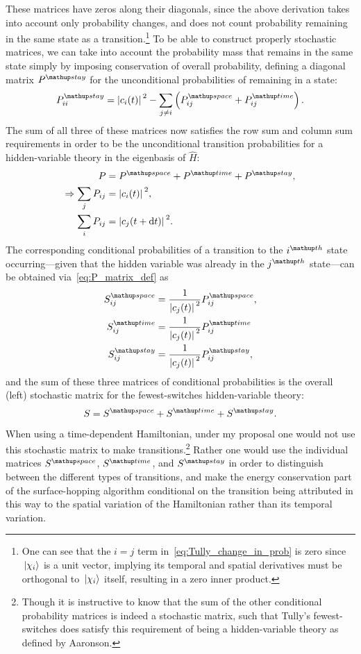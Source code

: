 These matrices have zeros along their diagonals, since the above derivation takes into account only probability changes, and does not count probability remaining in the same state as a transition.\footnote{One can see that the $i=j$ term in~\eqref{eq:Tully_change_in_prob} is zero since $\ket{\chi_i}$ is a unit vector, implying its temporal and spatial derivatives must be orthogonal to $\ket{\chi_i}$ itself, resulting in a zero inner product.} To be able to construct properly stochastic matrices, we can take into account the probability mass that remains in the same state simply by imposing conservation of overall probability, defining a diagonal matrix $P^\up{stay}$ for the unconditional probabilities of remaining in a state:
\begin{align}
P^\up{stay}_{ii} = \abs{c_i(t)}^2
- \sum_{j\neq i} \left(P^\up{space}_{ij} + P^\up{time}_{ij}\right).
\end{align}
The sum of all three of these matrices now satisfies the row sum and column sum requirements in order to be the unconditional transition probabilities for a hidden-variable theory in the eigenbasis of $\hat H$:
\begin{align}
P &= P^\up{space} + P^\up{time} + P^\up{stay},\\
\Rightarrow \sum_j P_{ij} &= \abs{c_i(t)}^2,\\
\sum_i P_{ij} &= \abs{c_j(t + \dd t)}^2.
\end{align}
The corresponding conditional probabilities of a transition to the $i^\up{th}$ state occurring---given that the hidden variable was already in the $j^\up{th}$ state---can be obtained via~\eqref{eq:P_matrix_def} as
\begin{align}
S^\up{space}_{ij} &= \frac1{\abs{c_j(t)}^2} P^\up{space}_{ij},\label{eq:S_space}\\
S^\up{time}_{ij} &= \frac1{\abs{c_j(t)}^2} P^\up{time}_{ij}\label{eq:S_time}\\
S^\up{stay}_{ij} &= \frac1{\abs{c_j(t)}^2} P^\up{stay}_{ij}\label{eq:S_stay},
\end{align}
and the sum of these three matrices of conditional probabilities is the overall (left) stochastic matrix for the fewest-switches hidden-variable theory:
\begin{align}
S = S^\up{space} + S^\up{time} + S^\up{stay}.
\end{align}
When using a time-dependent Hamiltonian, under my proposal one would not use this stochastic matrix to make transitions.\footnote{Though it is instructive to know that the sum of the other conditional probability matrices is indeed a stochastic matrix, such that Tully's fewest-switches does satisfy this requirement of being a hidden-variable theory as defined by Aaronson.} Rather one would use the individual matrices $S^\up{space}$, $S^\up{time}$, and $S^\up{stay}$ in order to distinguish between the different types of transitions, and make the energy conservation part of the surface-hopping algorithm conditional on the transition being attributed in this way to the spatial variation of the Hamiltonian rather than its temporal variation.

